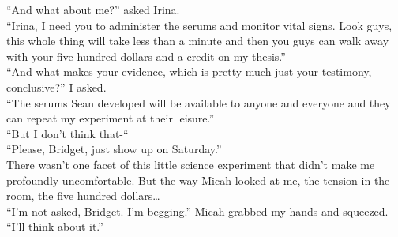 \documentclass[a5paper]{scrartcl}
\def\asterism{\par\vspace{1em}{\centering\scalebox{1.5}{%
  \stackon[-0.5pt]{\bfseries*~*}{\bfseries*}}\par}\vspace{.5em}\par}
\begin{document}
\enquote{And what about me?} asked Irina.\\
\enquote{Irina, I need you to administer the serums and monitor vital signs. Look guys, this whole thing will take less than a minute and then you guys can walk away with your five hundred dollars and a credit on my thesis.}\\
\enquote{And what makes your evidence, which is pretty much just your testimony, conclusive?} I asked.\\
\enquote{The serums Sean developed will be available to anyone and everyone and they can repeat my experiment at their leisure.}\\
“But I don't think that-“\\
\enquote{Please, Bridget, just show up on Saturday.}\\
There wasn't one facet of this little science experiment that didn't make me profoundly uncomfortable. But the way Micah looked at me, the tension in the room, the five hundred dollars\dots\\
\enquote{I'm not asked, Bridget. I'm begging.} Micah grabbed my hands and squeezed.\\
\enquote{I'll think about it.}

\asterism
\end{document}
